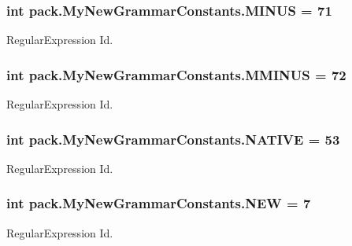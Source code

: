 \subsubsection[{\texorpdfstring{M\+I\+N\+US}{MINUS}}]{\setlength{\rightskip}{0pt plus 5cm}int pack.\+My\+New\+Grammar\+Constants.\+M\+I\+N\+US = 71}\hypertarget{interfacepack_1_1_my_new_grammar_constants_a622add29ed494edd24bd8d75296b5d66}{}\label{interfacepack_1_1_my_new_grammar_constants_a622add29ed494edd24bd8d75296b5d66}
Regular\+Expression Id. 
\subsubsection[{\texorpdfstring{M\+M\+I\+N\+US}{MMINUS}}]{\setlength{\rightskip}{0pt plus 5cm}int pack.\+My\+New\+Grammar\+Constants.\+M\+M\+I\+N\+US = 72}\hypertarget{interfacepack_1_1_my_new_grammar_constants_a753769e8343ebf1545cc70405d8b1d7c}{}\label{interfacepack_1_1_my_new_grammar_constants_a753769e8343ebf1545cc70405d8b1d7c}
Regular\+Expression Id. 
\subsubsection[{\texorpdfstring{N\+A\+T\+I\+VE}{NATIVE}}]{\setlength{\rightskip}{0pt plus 5cm}int pack.\+My\+New\+Grammar\+Constants.\+N\+A\+T\+I\+VE = 53}\hypertarget{interfacepack_1_1_my_new_grammar_constants_a6f398190e9e8b3952cad23bb73a99d43}{}\label{interfacepack_1_1_my_new_grammar_constants_a6f398190e9e8b3952cad23bb73a99d43}
Regular\+Expression Id. 
\subsubsection[{\texorpdfstring{N\+EW}{NEW}}]{\setlength{\rightskip}{0pt plus 5cm}int pack.\+My\+New\+Grammar\+Constants.\+N\+EW = 7}\hypertarget{interfacepack_1_1_my_new_grammar_constants_a26a1a859fabdbd25a3eb361bebbf578e}{}\label{interfacepack_1_1_my_new_grammar_constants_a26a1a859fabdbd25a3eb361bebbf578e}
Regular\+Expression Id. 
